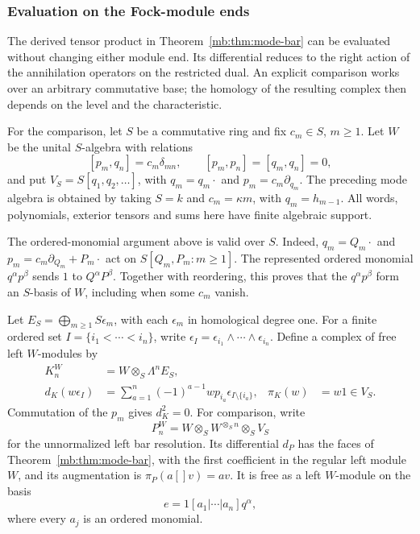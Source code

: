 \subsubsection{Evaluation on the Fock-module ends}
\label{mbh:sec}

The derived tensor product in Theorem~\ref{mb:thm:mode-bar} can be
evaluated without changing either module end.  Its differential reduces
to the right action of the annihilation operators on the restricted
dual.  An explicit comparison works over an arbitrary commutative base;
the homology of the resulting complex then depends on the level and
the characteristic.

For the comparison, let \(S\) be a commutative ring and fix
\(c_m\in S\), \(m\ge1\).  Let \(W\) be the unital \(S\)-algebra
with relations
\[
 [p_m,q_n]=c_m\delta_{mn},\qquad
 [p_m,p_n]=[q_m,q_n]=0,
\]
and put \(V_S=S[q_1,q_2,\ldots]\), with
\(q_m=q_m\cdot\) and \(p_m=c_m\partial_{q_m}\).
The preceding mode algebra is obtained by taking \(S=k\) and
\(c_m=\kappa m\), with \(q_m=h_{m-1}\).
All words, polynomials, exterior tensors and sums here have finite
algebraic support.

The ordered-monomial argument above is valid over \(S\).
Indeed, \(q_m=Q_m\cdot\) and
\(p_m=c_m\partial_{Q_m}+P_m\cdot\) act on
\(S[Q_m,P_m:m\ge1]\).  The represented ordered monomial
\(q^\alpha p^\beta\) sends \(1\) to \(Q^\alpha P^\beta\).
Together with reordering, this proves that
the \(q^\alpha p^\beta\) form an \(S\)-basis of \(W\), including
when some \(c_m\) vanish.

Let \(E_S=\bigoplus_{m\ge1}S\epsilon_m\), with each
\(\epsilon_m\) in homological degree one.  For a finite ordered set
\(I=\{i_1<\cdots<i_n\}\), write
\(\epsilon_I=\epsilon_{i_1}\wedge\cdots\wedge\epsilon_{i_n}\).
Define a complex of free left \(W\)-modules by
\begin{equation}\label{mbh:eq:free-koszul}
 \begin{aligned}
 K^W_n&=W\otimes_S\Lambda^n E_S,\\
 d_K(w\epsilon_I)
   &=\sum_{a=1}^n(-1)^{a-1}
       wp_{i_a}\epsilon_{I\setminus\{i_a\}},&
 \pi_K(w)&=w1\in V_S.
 \end{aligned}
\end{equation}
Commutation of the \(p_m\) gives \(d_K^2=0\).
For comparison, write
\[
 P^W_n=W\otimes_S W^{\otimes_S n}\otimes_S V_S
\]
for the unnormalized left bar resolution.  Its differential \(d_P\)
has the faces of Theorem~\ref{mb:thm:mode-bar}, with the first
coefficient in the regular left module \(W\), and its augmentation is
\(\pi_P(a[]v)=av\).  It is free as a left \(W\)-module on the basis
\begin{equation}\label{mbh:eq:bar-basis}
 e=1[a_1|\cdots|a_n]q^\alpha,
\end{equation}
where every \(a_j\) is an ordered monomial.

